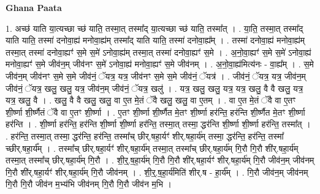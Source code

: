 \documentclass[17pt]{extarticle}
\begin{document}
\textbf{Ghana Paata } \newline

1. अच्छ॑ याति या॒त्यच्छा च्छ॑ याति॒ तस्मा॒त् तस्मा᳚द् या॒त्यच्छा च्छ॑ याति॒ तस्मा᳚त् । . या॒ति॒ तस्मा॒त् तस्मा᳚द् याति याति॒ तस्मा॑ दनोवा॒ह्य॑ मनोवा॒ह्य॑म् तस्मा᳚द् याति याति॒ तस्मा॑ दनोवा॒ह्य᳚म् । . तस्मा॑ दनोवा॒ह्य॑ मनोवा॒ह्य॑म् तस्मा॒त् तस्मा॑ दनोवा॒ह्यꣳ॑ स॒मे स॒मे॑ ऽनोवा॒ह्य॑म् तस्मा॒त् तस्मा॑ दनोवा॒ह्यꣳ॑ स॒मे । . अ॒नो॒वा॒ह्यꣳ॑ स॒मे स॒मे॑ ऽनोवा॒ह्य॑ मनोवा॒ह्यꣳ॑ स॒मे जीव॑न॒म् जीव॑नꣳ स॒मे॑ ऽनोवा॒ह्य॑ मनोवा॒ह्यꣳ॑ स॒मे जीव॑नम् । . अ॒नो॒वा॒ह्य॑मित्य॑नः - वा॒ह्य᳚म् । . स॒मे जीव॑न॒म् जीव॑नꣳ स॒मे स॒मे जीव॑नं॒ ॅयत्र॒ यत्र॒ जीव॑नꣳ स॒मे स॒मे जीव॑नं॒ ॅयत्र॑ । . जीव॑नं॒ ॅयत्र॒ यत्र॒ जीव॑न॒म् जीव॑नं॒ ॅयत्र॒ खलु॒ खलु॒ यत्र॒ जीव॑न॒म् जीव॑नं॒ ॅयत्र॒ खलु॑ । . यत्र॒ खलु॒ खलु॒ यत्र॒ यत्र॒ खलु॒ वै वै खलु॒ यत्र॒ यत्र॒ खलु॒ वै । . खलु॒ वै वै खलु॒ खलु॒ वा ए॒त मे॒तं ॅवै खलु॒ खलु॒ वा ए॒तम् । . वा ए॒त मे॒तं ॅवै वा ए॒तꣳ शी॒र्ष्णा शी॒र्ष्णैतं ॅवै वा ए॒तꣳ शी॒र्ष्णा । . ए॒तꣳ शी॒र्ष्णा शी॒र्ष्णैत मे॒तꣳ शी॒र्ष्णा हर॑न्ति॒ हर॑न्ति शी॒र्ष्णैत मे॒तꣳ शी॒र्ष्णा हर॑न्ति । . शी॒र्ष्णा हर॑न्ति॒ हर॑न्ति शी॒र्ष्णा शी॒र्ष्णा हर॑न्ति॒ तस्मा॒त् तस्मा॒ द्धर॑न्ति शी॒र्ष्णा शी॒र्ष्णा हर॑न्ति॒ तस्मा᳚त् । . हर॑न्ति॒ तस्मा॒त् तस्मा॒ द्धर॑न्ति॒ हर॑न्ति॒ तस्मा᳚च् छीर्.षहा॒र्यꣳ॑ शीर्.षहा॒र्य॑म् तस्मा॒ द्धर॑न्ति॒ हर॑न्ति॒ तस्मा᳚ च्छीर्.षहा॒र्य᳚म् । . तस्मा᳚च् छीर्.षहा॒र्यꣳ॑ शीर्.षहा॒र्य॑म् तस्मा॒त् तस्मा᳚च् छीर्.षहा॒र्य॑म् गि॒रौ गि॒रौ शी॑र्.षहा॒र्य॑म् तस्मा॒त् तस्मा᳚च् छीर्.षहा॒र्य॑म् गि॒रौ । . शी॒र्॒.ष॒हा॒र्य॑म् गि॒रौ गि॒रौ शी॑र्.षहा॒र्यꣳ॑ शीर्.षहा॒र्य॑म् गि॒रौ जीव॑न॒म् जीव॑नम् गि॒रौ शी॑र्.षहा॒र्यꣳ॑ शीर्.षहा॒र्य॑म् गि॒रौ जीव॑नम् । . शी॒र्॒.ष॒हा॒र्य॑मिति॑ शीर्.ष - हा॒र्य᳚म् । . गि॒रौ जीव॑न॒म् जीव॑नम् गि॒रौ गि॒रौ जीव॑न म॒भ्य॑भि जीव॑नम् गि॒रौ गि॒रौ जीव॑न म॒भि । \newline
\end{document}
